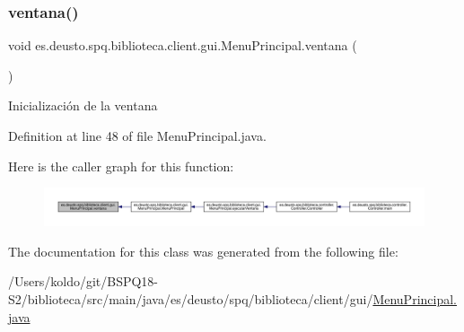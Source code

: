 \subsubsection{\texorpdfstring{ventana()}{ventana()}}
{\footnotesize\ttfamily void es.\+deusto.\+spq.\+biblioteca.\+client.\+gui.\+Menu\+Principal.\+ventana (\begin{DoxyParamCaption}{ }\end{DoxyParamCaption})}

Inicialización de la ventana 

Definition at line 48 of file Menu\+Principal.\+java.

Here is the caller graph for this function\+:
\nopagebreak
\begin{figure}[H]
\begin{center}
\leavevmode
\includegraphics[width=350pt]{classes_1_1deusto_1_1spq_1_1biblioteca_1_1client_1_1gui_1_1_menu_principal_a6d0a1420be215523ce7195628b2c3002_icgraph}
\end{center}
\end{figure}


The documentation for this class was generated from the following file\+:\begin{DoxyCompactItemize}
\item 
/\+Users/koldo/git/\+B\+S\+P\+Q18-\/\+S2/biblioteca/src/main/java/es/deusto/spq/biblioteca/client/gui/\mbox{\hyperlink{_menu_principal_8java}{Menu\+Principal.\+java}}\end{DoxyCompactItemize}
